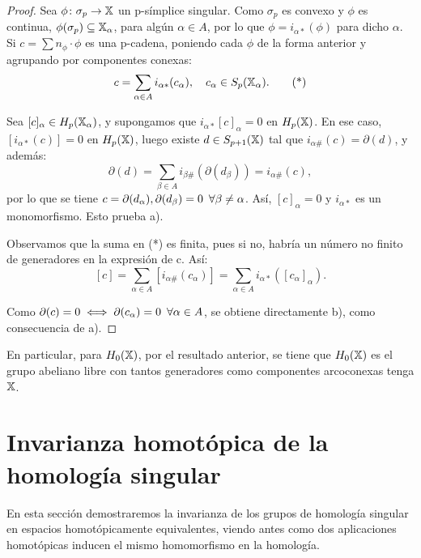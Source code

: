 \begin{proof}
  Sea $\phi \colon \sigma_p \to {\mathbb X}$ un p-símplice singular. Como $\sigma_p$ es convexo y $\phi$ es continua, $\phi(\sigma_p) \subseteq {\mathbb X}_\alpha$, para algún
  $\alpha \in A$, por lo que $\phi = i_{\alpha*}(\phi)$ para dicho $\alpha$. \\
  Si $c = \sum n_\phi \cdot \phi$ es una p-cadena, poniendo cada $\phi$ de la forma anterior y agrupando por componentes conexas:
  \begin{equation}
    c = \sum\limits_{\alpha \in A} i_{\alpha*}(c_\alpha), \quad c_\alpha \in S_p({\mathbb X}_\alpha).  \tag{*}
  \end{equation}

  Sea $[c]_\alpha \in H_p({\mathbb X}_\alpha)$, y supongamos que $i_{\alpha*}[c]_\alpha = 0$ en $H_p({\mathbb X})$. En ese caso, $[i_{\alpha*}(c)] = 0$ en $H_p({\mathbb X})$,
  luego existe $d \in S_{p+1}({\mathbb X})$ tal que $i_{\alpha\#}(c) = \partial(d)$, y además:
  \[\partial(d) = \sum\limits_{\beta \in A} i_{\beta\#}(\partial(d_\beta)) = i_{\alpha\#}(c), \]
  por lo que se tiene $c = \partial(d_\alpha), \partial(d_\beta) = 0 \hspace{0.5em} \forall \beta \neq \alpha$. Así, $[c]_\alpha = 0$ y $i_{\alpha*}$ es un monomorfismo.
  Esto prueba a).

  Observamos que la suma en (*) es finita, pues si no, habría un número no finito de generadores en la expresión de c. Así:
  \[  [c] = \sum\limits_{\alpha \in A} [i_{\alpha\#}(c_\alpha)] =  \sum\limits_{\alpha \in A} i_{\alpha*}([c_\alpha]_\alpha).\]

  Como $\partial(c) = 0 \iff \partial(c_\alpha) = 0 \hspace{0.5em} \forall \alpha \in A$, se obtiene directamente b), como consecuencia de a).
\end{proof}

En particular, para $H_0({\mathbb X})$, por el resultado anterior, se tiene que $H_0({\mathbb X})$ es el grupo abeliano libre con tantos generadores como
componentes arcoconexas tenga ${\mathbb X}$.

\section{Invarianza homotópica de la homología singular}

En esta sección demostraremos la invarianza de los grupos de homología singular en espacios homotópicamente equivalentes, viendo antes como
dos aplicaciones homotópicas inducen el mismo homomorfismo en la homología.

